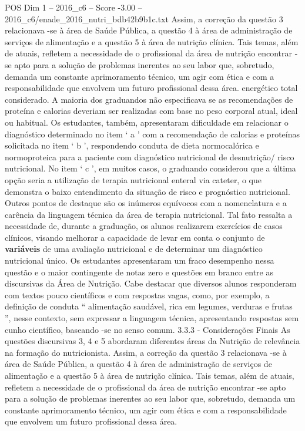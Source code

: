 \begin{textsample}{POS Dim 1 – 2016\_c6 – Score -3.00 – 2016\_c6/enade\_2016\_nutri\_bdb42b9b1c.txt}
Assim, a correção da questão 3 relacionava -se à área de Saúde Pública, a questão 4 à área de administração de serviços de alimentação e a questão 5 à área de nutrição clínica.
Tais temas, além de atuais, refletem a necessidade de o profissional da área de nutrição encontrar -se apto para a solução de problemas inerentes ao seu labor que, sobretudo, demanda um constante aprimoramento técnico, um agir com ética e com a responsabilidade que envolvem um futuro profissional dessa área. energético total considerado.
A maioria dos graduandos não especificava se as recomendações de proteína e calorias deveriam ser realizadas com base no peso corporal atual, ideal ou habitual.
Os estudantes, também, apresentaram dificuldade em relacionar o diagnóstico determinado no item ‘ a ’ com a recomendação de calorias e proteínas solicitada no item ‘ b ’, respondendo conduta de dieta normocalórica e normoproteica para a paciente com diagnóstico nutricional de desnutrição/ risco nutricional.
No item ‘ c ’, em muitos casos, o graduando considerou que a última opção seria a utilização de terapia nutricional enteral via cateter, o que demonstra o baixo entendimento da situação de risco e prognóstico nutricional.
Outros pontos de destaque são os inúmeros equívocos com a nomenclatura e a carência da linguagem técnica da área de terapia nutricional.
Tal fato ressalta a necessidade de, durante a graduação, os alunos realizarem exercícios de casos clínicos, visando melhorar a capacidade de levar em conta o conjunto de \textbf{variáveis} de uma avaliação nutricional e de determinar um diagnóstico nutricional único.
Os estudantes apresentaram um fraco desempenho nessa questão e o maior contingente de notas zero e questões em branco entre as discursivas da Área de Nutrição.
Cabe destacar que diversos alunos responderam com textos pouco científicos e com respostas vagas, como, por exemplo, a definição de conduta “ alimentação saudável, rica em legumes, verduras e frutas ”, nesse contexto, sem expressar a linguagem técnica, apresentando respostas sem cunho científico, baseando -se no senso comum. 3.3.3 - Considerações Finais As questões discursivas 3, 4 e 5 abordaram diferentes áreas da Nutrição de relevância na formação do nutricionista.
Assim, a correção da questão 3 relacionava -se à área de Saúde Pública, a questão 4 à área de administração de serviços de alimentação e a questão 5 à área de nutrição clínica.
Tais temas, além de atuais, refletem a necessidade de o profissional da área de nutrição encontrar -se apto para a solução de problemas inerentes ao seu labor que, sobretudo, demanda um constante aprimoramento técnico, um agir com ética e com a responsabilidade que envolvem um futuro profissional dessa área.

\end{textsample}
